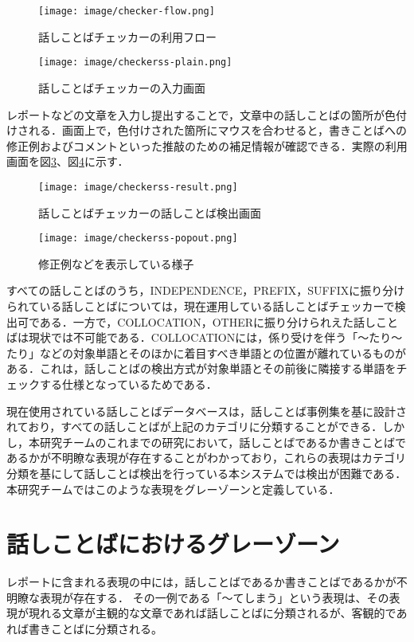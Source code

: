 \begin{figure}[H] %
	\centering
 	\texttt{[image: image/checker-flow.png]}
	\caption{話しことばチェッカーの利用フロー}
	\label{checkerss-plain}
\end{figure}

\begin{figure}[H] %
	\centering
 	\texttt{[image: image/checkerss-plain.png]}
	\caption{話しことばチェッカーの入力画面}
	\label{checkerss-plain}
\end{figure}

レポートなどの文章を入力し提出することで，文章中の話しことばの箇所が色付けされる．画面上で，色付けされた箇所にマウスを合わせると，書きことばへの修正例およびコメントといった推敲のための補足情報が確認できる．実際の利用画面を図\ref{checkerss-result}、図\ref{checkerss-popout}に示す．

\begin{figure}[H]
	\centering
 	\texttt{[image: image/checkerss-result.png]}
	\caption{話しことばチェッカーの話しことば検出画面}
	\label{checkerss-result}
\end{figure}

\begin{figure}[H]
	\centering
 	\texttt{[image: image/checkerss-popout.png]}
	\caption{修正例などを表示している様子}
	\label{checkerss-popout}
\end{figure}

すべての話しことばのうち，INDEPENDENCE，PREFIX，SUFFIXに振り分けられている話しことばについては，現在運用している話しことばチェッカーで検出可である．一方で，COLLOCATION，OTHERに振り分けられえた話しことばは現状では不可能である．COLLOCATIONには，係り受けを伴う「～たり～たり」などの対象単語とそのほかに着目すべき単語との位置が離れているものがある．これは，話しことばの検出方式が対象単語とその前後に隣接する単語をチェックする仕様となっているためである．

現在使用されている話しことばデータベースは，話しことば事例集を基に設計されており，すべての話しことばが上記のカテゴリに分類することができる．しかし，本研究チームのこれまでの研究において，話しことばであるか書きことばであるかが不明瞭な表現が存在することがわかっており，これらの表現はカテゴリ分類を基にして話しことば検出を行っている本システムでは検出が困難である．本研究チームではこのような表現をグレーゾーンと定義している．

\section{話しことばにおけるグレーゾーン}
レポートに含まれる表現の中には，話しことばであるか書きことばであるかが不明瞭な表現が存在する．
その一例である「～てしまう」という表現は、その表現が現れる文章が主観的な文章であれば話しことばに分類されるが、客観的であれば書きことばに分類される。

